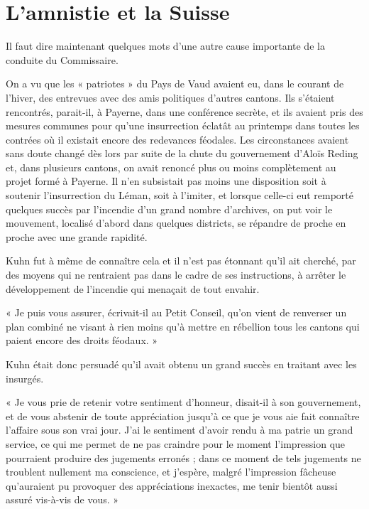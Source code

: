\documentclass[french,twoside]{book} %
\newenvironment{quoteblock}%
  {\begin{quoting}}
  {\end{quoting}}
\newenvironment{quotebar}{%
    \def\FrameCommand{{\color{rubric!10!}\vrule width 0.5em} \hspace{0.9em}}%
    \def\OuterFrameSep{\itemsep} %
    \MakeFramed {\advance\hsize-\width \FrameRestore}
  }%
  {%
    \endMakeFramed
  }
\renewenvironment{quoteblock}%
  {%
    \savenotes
    \setstretch{0.9}
    \begin{quotebar}
  }
  {%
    \end{quotebar}
    \spewnotes
  }
\begin{document}
\section[L’amnistie et la Suisse]{L’amnistie et la Suisse}
\noindent Il faut dire maintenant quelques mots d’une autre cause importante de la conduite du Commissaire.\par
On a vu que les « patriotes » du Pays de Vaud avaient eu, dans le courant de l’hiver, des entrevues avec des amis politiques d’autres cantons. Ils s’étaient rencontrés, parait-il, à Payerne, dans une conférence secrète, et ils avaient pris des mesures communes pour qu’une insurrection éclatât au printemps dans toutes les contrées où il existait encore des redevances féodales. Les circonstances avaient sans doute changé dès lors par suite de la chute du gouvernement d’Aloïs Reding et, dans plusieurs cantons, on avait renoncé plus ou moins complètement au projet formé à Payerne. Il n’en subsistait pas moins une disposition soit à soutenir l’insurrection du Léman, soit à l’imiter, et lorsque celle-ci eut remporté quelques succès par l’incendie d’un grand nombre d’archives, on put voir le mouvement, localisé d’abord dans quelques districts, se répandre de proche en proche avec une grande rapidité.\par
Kuhn fut à même de connaître cela et il n’est pas étonnant qu’il ait cherché, par des moyens qui ne rentraient pas dans le cadre de ses instructions, à arrêter le développement de l’incendie qui menaçait de tout envahir.\par

\begin{quoteblock}
 \noindent « Je puis vous assurer, écrivait-il au Petit Conseil, qu’on vient de renverser un plan combiné ne visant à rien moins qu’à mettre en rébellion tous les cantons qui paient encore des droits féodaux. »
 \end{quoteblock}

\noindent Kuhn était donc persuadé qu’il avait obtenu un grand succès en traitant avec les insurgés.\par

\begin{quoteblock}
 \noindent « Je vous prie de retenir votre sentiment d’honneur, disait-il à son gouvernement, et de vous abstenir de toute appréciation jusqu’à ce que je vous aie fait connaître l’affaire sous son vrai jour. J’ai le sentiment d’avoir rendu à ma patrie un grand service, ce qui me permet de ne pas craindre pour le moment l’impression que pourraient produire des jugements erronés ; dans ce moment de tels jugements ne troublent nullement ma conscience, et j’espère, malgré l’impression fâcheuse qu’auraient pu provoquer des appréciations inexactes, me tenir bientôt aussi assuré vis-à-vis de vous. »
 \end{quoteblock}
\end{document}
